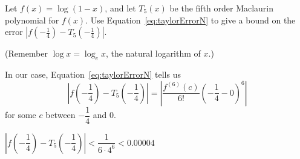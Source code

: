 \begin{Mquestion}
Let $f(x)=\log (1-x)$, and let $T_5(x)$ be the fifth order Maclaurin polynomial for $f(x)$. Use Equation~\ref*{eq:taylorErrorN} to give a bound on the error $|f\left(-\frac{1}{4}\right)-T_5\left(-\frac{1}{4}\right)|$.

(Remember $\log x=\log_ex$, the natural logarithm of $x$.)
\end{Mquestion}
\begin{hint}
In our case, Equation~\ref*{eq:taylorErrorN} tells us
\[\left|f\left(-\dfrac{1}{4}\right)-T_5\left(-\dfrac{1}{4}\right)\right| = \left|\dfrac{f^{(6)}(c)}{6!}\left(-\dfrac{1}{4}-0\right)^6\right|\]
for some $c$ between $-\dfrac{1}{4}$ and 0.
\end{hint}
\begin{answer}
$\left|f\left(-\dfrac{1}{4}\right)-T_5\left(-\dfrac{1}{4}\right)\right| < \dfrac{1}{6\cdot 4^6}<0.00004$
\end{answer}
